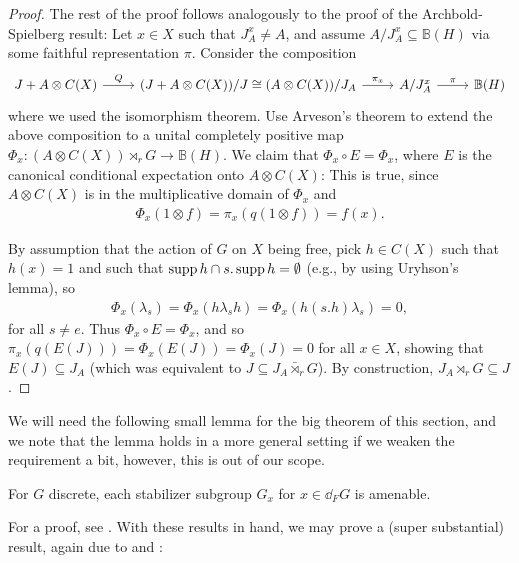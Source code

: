\begin{proof}
	The rest of the proof follows analogously to the proof of the Archbold-Spielberg result: Let $x \in X$ such that $J_A^x \neq A$, and assume $A/J_A^x \subseteq \mathbb{B}(H)$ via some faithful representation $\pi$. Consider the composition
	\begin{equation}
		\begin{tikzcd}
			J + A \otimes C(X) \ar[r, "Q"] & (J+ A \otimes C(X))/J \cong  (A \otimes C(X))/J_A \ar[r, "\pi_x"] & A/J_A^x \ar[r, "\pi"] &\mathbb{B}(H)
		\end{tikzcd}
	\end{equation}
	where we used the isomorphism theorem. Use Arveson's theorem to extend the above composition to a unital completely positive map $\Phi_x \colon (A \otimes C(X)) \rtimes_r G \to \mathbb{B}(H)$. We claim that $\Phi_x \circ E = \Phi_x$, where $E$ is the canonical conditional expectation onto $A \otimes C(X)$: This is true, since $A \otimes C(X)$ is in the multiplicative domain of $\Phi_x$ and 
	\begin{align*}
		\Phi_x(1 \otimes f) = \pi_x(q(1 \otimes f)) = f(x).
	\end{align*}
	
	By assumption that the action of $G$ on $X$ being free, pick $h \in C(X)$ such that $h(x) = 1$ and such that $\operatorname{supp} h \cap s. \operatorname{supp} h  = \emptyset$ (e.g., by using Uryhson's lemma), so
	\begin{align*}
	\Phi_x( \lambda_s) = \Phi_x ( h \lambda_s h ) = \Phi_x (h (s.h) \lambda_s) = 0,		
	\end{align*}
	for all $s \neq e$. Thus $\Phi_x \circ E = \Phi_x$, and so $\pi_x(q(E(J))) = \Phi_x(E(J)) = \Phi_x(J) = 0$ for all $x \in X$, showing that $E(J) \subseteq J_A$ (which was equivalent to $J \subseteq J_A \bar \rtimes_r G$). By construction, $J_A \rtimes_r G \subseteq J$.	
\end{proof}
We will need the following small lemma for the big theorem of this section, and we note that the lemma holds in a more general setting if we weaken the requirement a bit, however, this is out of our scope.
\begin{lemma}
	For $G$ discrete, each stabilizer subgroup $G_x$ for $x \in \dd_F G$ is amenable.
	\label{stabfurstamen}
\end{lemma}
For a proof, see \cite[lemma 11]{ozawa2014lecture}. With these results in hand, we may prove a (super substantial) result, again due to \cite{breuillard2017c} and \cite{kalantar2017boundaries}:
